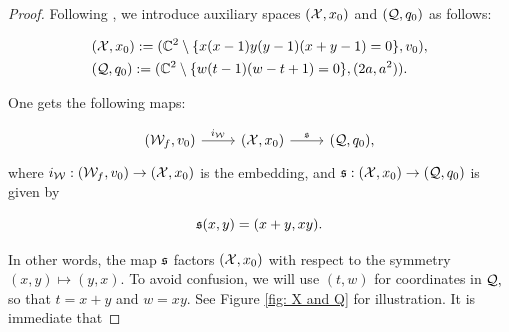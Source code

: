 \documentclass{article}
\begin{document}
\begin{proof}
Following \cite{HK}, we introduce auxiliary spaces $(\mathcal{X},x_0)$ and $(\mathcal{Q},q_0)$ as follows:
    
\begin{align*}
    & (\mathcal{X},x_0):=(\mathbb{C}^2\setminus \{x(x-1)y(y-1)(x+y-1)=0\},v_0),\\
    & (\mathcal{Q},q_0):=(\mathbb{C}^2\setminus \{w(t-1)(w-t+1)=0\},(2a,a^2)).
\end{align*}


One gets the following maps:

$$
\begin{tikzcd}
    (\W_f,v_0) \arrow[r, "i_\W"] & (\X,x_0) \arrow[r, "\s"] & (\Q,q_0),
\end{tikzcd}
$$
where $i_{\mathcal{W}}:(\mathcal{W}_f,v_0)\to (\mathcal{X},x_0)$ is the embedding, and $\mathfrak{s}:(\mathcal{X},x_0)\to (\mathcal{Q},q_0)$ is given by 

$$
\mathfrak{s}(x,y)=(x+y,xy).
$$

In other words, the map $\mathfrak{s}$ factors $(\mathcal{X},x_0)$ with respect to the symmetry $(x,y)\mapsto (y,x).$ To avoid confusion, we will use $(t,w)$ for coordinates in $\mathcal{Q},$ so that $t=x+y$ and $w=xy.$ See Figure \ref{fig: X and Q} for illustration. It is immediate that 


\end{proof}
\end{document}
